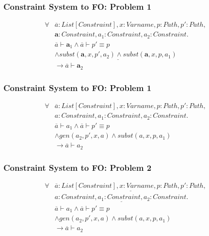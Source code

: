 \documentclass[leqno]{beamer}
\begin{document}
\begin{frame}
    \frametitle{Constraint System to FO: Problem 1}
    \begin{prooftree}
    \end{prooftree}
    \begin{align*}
    \forall &\overline{a}: List[Constraint], x: Varname, p: Path, p': Path, \\
    &\textbf{a}: Constraint, a_1: Constraint, a_2: Constraint. \\
    & \overline{a} \vdash \textbf{a}_1 \land \overline{a} \vdash p' \equiv p \\
    & \land \underline{subst(\textbf{a}, x, p', a_2) \land subst(\textbf{a}, x, p, a_1)}\\
    & \rightarrow \overline{a} \vdash \textbf{a}_2
    \end{align*}
\end{frame}

\begin{frame}
    \frametitle{Constraint System to FO: Problem 1}
    \begin{prooftree}
    \end{prooftree}
    \begin{align*}
    \forall &\overline{a}: List[Constraint], x: Varname, p: Path, p': Path, \\
    & a: Constraint, a_1: Constraint, a_2: Constraint. \\
    & \overline{a} \vdash a_1 \land \overline{a} \vdash p' \equiv p \\
    & \land gen(a_2, p', x, a) \land subst(a, x, p, a_1)\\
    & \rightarrow \overline{a} \vdash a_2
    \end{align*}
\end{frame}

\begin{frame}
    \frametitle{Constraint System to FO: Problem 2}
    \begin{prooftree}
    \end{prooftree}
    \begin{align*}
    \forall &\underline{\overline{a}: List[Constraint], x: Varname, p: Path, p': Path,} \\
    &\underline{a: Constraint, a_1: Constraint, a_2: Constraint.} \\
    & \overline{a} \vdash a_1 \land \overline{a} \vdash p' \equiv p \\
    & \land gen(a_2, p', x, a) \land subst(a, x, p, a_1)\\
    & \rightarrow \overline{a} \vdash a_2
    \end{align*}
\end{frame}
\end{document}
